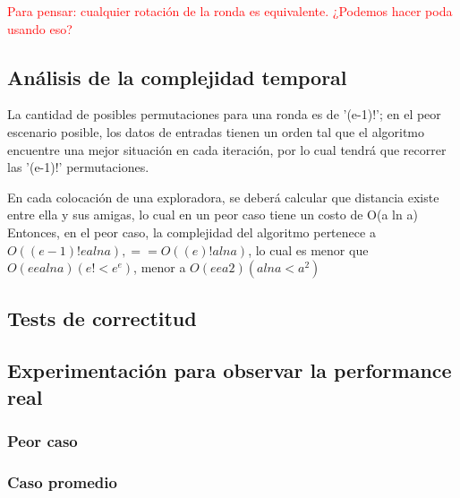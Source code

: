 \textcolor{red}{ Para pensar: cualquier rotación de la ronda es equivalente. ¿Podemos hacer poda usando eso?}

\subsection{Análisis de la complejidad temporal}
La cantidad de posibles permutaciones para una ronda es de '(e-1)!'; en el peor escenario posible, los datos de entradas tienen un orden tal que el algoritmo encuentre una mejor situación en cada iteración, por lo cual tendrá que recorrer las '(e-1)!' permutaciones. 

En cada colocación de una exploradora, se deberá calcular que distancia existe entre ella y sus amigas, lo cual en un peor caso tiene un costo de O(a ln a)
Entonces, en el peor caso, la complejidad del algoritmo pertenece a $O( (e-1)! e a ln a), == O( (e)! a ln a)$,   lo cual es menor que $O(ee a lna) (e! < e^e)$, menor a  $O(ee a2) (a ln a < a^2)$

\subsection{Tests de correctitud}

\subsection{Experimentación para observar la performance real}

\subsubsection{Peor caso}

\subsubsection{Caso promedio}
